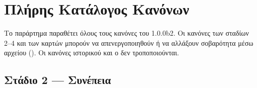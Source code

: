 \chapter{Πλήρης Κατάλογος Κανόνων}
\label{app:rules}

Το παράρτημα παραθέτει όλους τους κανόνες του \Probolos{} 1.0.0b2. Οι κανόνες
των σταδίων 2–4 και των καρτών μπορούν να απενεργοποιηθούν ή να αλλάξουν
σοβαρότητα μέσω αρχείου  (). Οι κανόνες ιστορικού και ο
 δεν τροποποιούνται.

\section{Στάδιο 2 — Συνέπεια}

